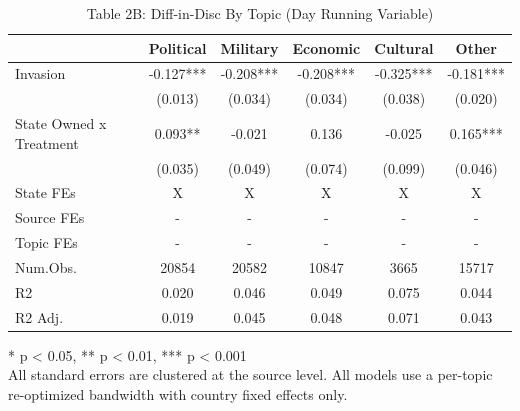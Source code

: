 \begin{table}[!t]
\caption{Table 2B: Diff-in-Disc By Topic (Day Running Variable)} 
\fontsize{12.0pt}{14.4pt}\selectfont
\begin{tabular*}{\linewidth}{@{\extracolsep{\fill}}lccccc}
\toprule
  & Political & Military & Economic & Cultural & Other \\ 
\midrule\addlinespace[2.5pt]
Invasion & -0.127*** & -0.208*** & -0.208*** & -0.325*** & -0.181*** \\ 
 & (0.013) & (0.034) & (0.034) & (0.038) & (0.020) \\ 
State Owned x Treatment & 0.093** & -0.021 & 0.136 & -0.025 & 0.165*** \\ 
{} & {(0.035)} & {(0.049)} & {(0.074)} & {(0.099)} & {(0.046)} \\ 
State FEs & X & X & X & X & X \\ 
Source FEs & - & - & - & - & - \\ 
Topic FEs & - & - & - & - & - \\ 
Num.Obs. & 20854 & 20582 & 10847 & 3665 & 15717 \\ 
R2 & 0.020 & 0.046 & 0.049 & 0.075 & 0.044 \\ 
R2 Adj. & 0.019 & 0.045 & 0.048 & 0.071 & 0.043 \\ 
\bottomrule
\end{tabular*}
\begin{minipage}{\linewidth}
* p < 0.05, ** p < 0.01, *** p < 0.001\\
All standard errors are clustered at the source level. All models use a
per-topic re-optimized bandwidth with country fixed effects only.\\
\end{minipage}
\end{table}

